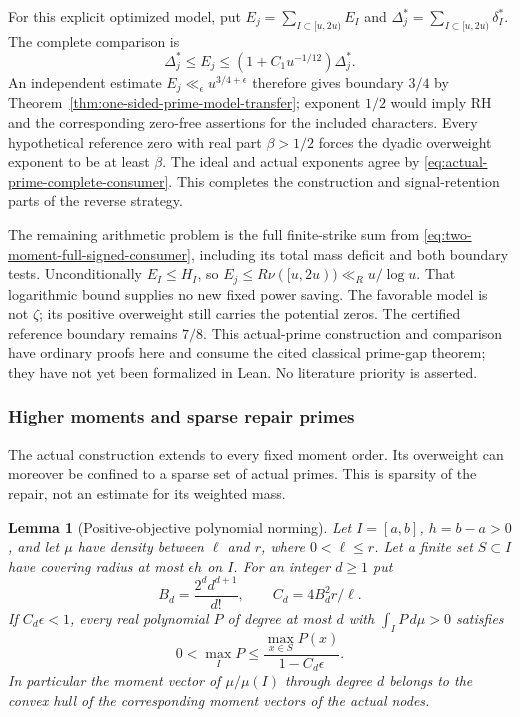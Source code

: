 \documentclass[11pt]{article}
\newtheorem{lemma}[theorem]{Lemma}
\theoremstyle{definition}
\begin{document}
For this explicit optimized model, put
$E_j=\sum_{I\subset[u,2u)}E_I$ and
$\Delta_j^*=\sum_{I\subset[u,2u)}\delta_I^*$.
The complete comparison is
\begin{equation}
 \Delta_j^*\le E_j\le(1+C_1u^{-1/12})\Delta_j^*.
 \label{eq:actual-prime-complete-consumer}
\end{equation}
An independent estimate $E_j\ll_\epsilon u^{3/4+\epsilon}$
therefore gives boundary $3/4$ by
Theorem~\ref{thm:one-sided-prime-model-transfer};
exponent $1/2$ would imply RH and the corresponding
zero-free assertions for the included characters.
Every hypothetical reference zero with real part $\beta>1/2$
forces the dyadic overweight exponent to be at least $\beta$.
The ideal and actual exponents agree by
\eqref{eq:actual-prime-complete-consumer}.
This completes the construction and signal-retention parts
of the reverse strategy.

The remaining arithmetic problem is the full finite-strike
sum from \eqref{eq:two-moment-full-signed-consumer}, including
its total mass deficit and both boundary tests.
Unconditionally $E_I\le H_I$, so
$E_j\le R\nu([u,2u))\ll_Ru/\log u$.
That logarithmic bound supplies no new fixed power saving.
The favorable model is not $\zeta$; its positive overweight
still carries the potential zeros. The certified reference
boundary remains $7/8$.
This actual-prime construction and comparison have ordinary
proofs here and consume the cited classical prime-gap theorem;
they have not yet been formalized in Lean.
No literature priority is asserted.

\subsubsection{Higher moments and sparse repair primes}
\label{sec:higher-moment-repair-primes}

The actual construction extends to every fixed moment order.
Its overweight can moreover be confined to a sparse set of actual
primes. This is sparsity of the repair, not an estimate for its
weighted mass.

\begin{lemma}[Positive-objective polynomial norming]
\label{lem:positive-objective-prime-norming}
Let $I=[a,b]$, $h=b-a>0$, and let $\mu$ have density between
$\ell$ and $r$, where $0<\ell\le r$. Let a finite set $S\subset I$
have covering radius at most $\epsilon h$ on $I$. For an integer
$d\ge1$ put
\[
 B_d=\frac{2^d d^{d+1}}{d!},\qquad C_d=4B_d^2r/\ell.
\]
If $C_d\epsilon<1$, every real polynomial $P$ of degree at most
$d$ with $\int_I P\,d\mu>0$ satisfies
\begin{equation}
 0<\max_I P\le
       \frac{\max_{x\in S}P(x)}{1-C_d\epsilon}.
 \label{eq:positive-objective-norming}
\end{equation}
In particular the moment vector of $\mu/\mu(I)$ through degree
$d$ belongs to the convex hull of the corresponding moment
vectors of the actual nodes.
\end{lemma}
\end{document}
